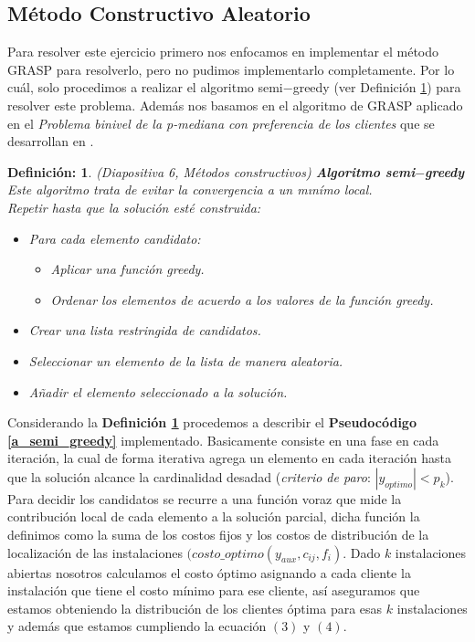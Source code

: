 \documentclass[11pt,letterpaper]{article}
\newtheorem{thmd}{Definición:}
\begin{document}
\subsection*{Método Constructivo Aleatorio}
Para resolver este ejercicio primero nos enfocamos en implementar el método GRASP para resolverlo, pero no pudimos implementarlo completamente. Por lo cuál, solo procedimos a realizar el algoritmo semi$-$greedy (ver Definición \ref{d_semi}) para resolver este problema. Además nos basamos en el algoritmo de GRASP aplicado en el \textit{Problema binivel de la p-mediana con preferencia de los clientes} que se desarrollan en \cite{arggis}.

\begin{framed}
    \begin{thmd} \label{d_semi}
    (Diapositiva 6, Métodos constructivos) \textbf{Algoritmo semi$-$greedy} Este algoritmo trata de evitar la convergencia a un mınímo local.\\
    
Repetir hasta que la solución esté construida:

\begin{itemize}
\item Para cada elemento candidato:
\begin{itemize}
\item Aplicar una función greedy.
\item Ordenar los elementos de acuerdo a los valores de la función greedy.
\end{itemize}
\item Crear una lista restringida de candidatos.
\item Seleccionar un elemento de la lista de manera aleatoria.
\item Añadir el elemento seleccionado a la solución.
\end{itemize}
    \end{thmd}
\end{framed}
Considerando la \textbf{Definición \ref{d_semi}} procedemos a describir el \textbf{Pseudocódigo \ref{a_semi_greedy}} implementado. Basicamente consiste en una fase en cada iteración, la cual de forma iterativa agrega un elemento en cada iteración hasta que la solución alcance la cardinalidad desadad (\textit{criterio de paro}:  $|y_{optimo}|<p_k$). \\

Para decidir los candidatos se recurre a una función voraz que mide la contribución local de cada elemento a la solución parcial, dicha función la definimos como la suma de los costos fijos y los costos de distribución de la localización de las instalaciones $(costo\_optimo(y_{aux}, c_{ij}, f_{i})$. Dado $k$ instalaciones abiertas nosotros calculamos el costo óptimo asignando a cada cliente la instalación que tiene el costo mínimo para ese cliente, así aseguramos que estamos obteniendo la distribución de los clientes óptima para esas $k$ instalaciones y además que estamos cumpliendo la  ecuación $(3)$ y $(4)$.  \\
\end{document}
